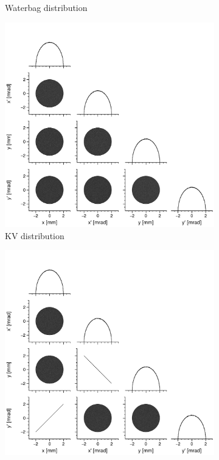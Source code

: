 \begin{figure}[!p]
\begin{subfigure}{0.49\textwidth}
        \caption{Waterbag distribution}
        \label{fig:distributions_waterbag}
    \end{subfigure}
    \vfill
    \begin{subfigure}{0.49\textwidth}
        \includegraphics[width=\textwidth]{Images/chapter1/KV_dist.png}
        \caption{KV distribution}
        \label{fig:distributions_kv}
    \end{subfigure}
    \hfill
    \begin{subfigure}{0.49\textwidth}
        \includegraphics[width=\textwidth]{Images/chapter1/Danilov_dist.png}

\end{subfigure}
\end{figure}

